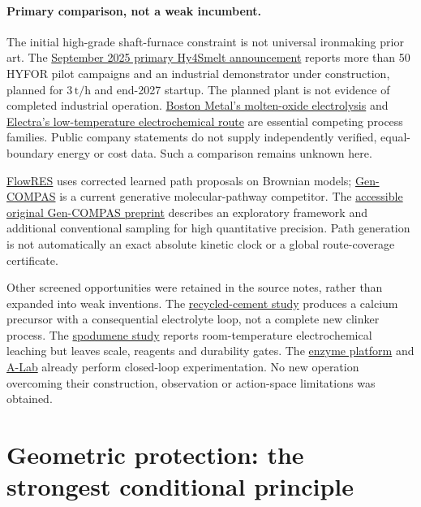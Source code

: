 \documentclass[11pt]{article}
\begin{document}
\paragraph{Primary comparison, not a weak incumbent.}
The initial high-grade shaft-furnace constraint is not universal ironmaking
prior art. The \href{https://www.primetals.com/en/news/construction-begins-on-hydrogen-based-ironmaking-plant-in-linz-austria/}{September 2025 primary Hy4Smelt announcement}
reports more than 50 HYFOR pilot campaigns and an industrial demonstrator under
construction, planned for $3\,\mathrm{t/h}$ and end-2027 startup.
The planned plant is not evidence of completed industrial operation.
\href{https://www.bostonmetal.com/moe-steel/}{Boston Metal's molten-oxide electrolysis}
and \href{https://ecs.confex.com/ecs/prime2024/meetingapp.cgi/Paper/197400}{Electra's low-temperature electrochemical route}
are essential competing process families. Public company statements do not
supply independently verified, equal-boundary energy or cost data. Such a
comparison remains unknown here.

\href{https://www.nature.com/articles/s42256-024-00918-3}{FlowRES}
uses corrected learned path proposals on Brownian models;
\href{https://www.nature.com/articles/s41586-026-11025-1}{Gen-COMPAS}
is a current generative molecular-pathway competitor. The
\href{https://arxiv.org/html/2510.24979v1}{accessible original Gen-COMPAS preprint}
describes an exploratory framework and additional conventional sampling for
high quantitative precision. Path generation is not automatically an exact
absolute kinetic clock or a global route-coverage certificate.

Other screened opportunities were retained in the source notes, rather than
expanded into weak inventions. The
\href{https://doi.org/10.1038/s41467-025-64339-5}{recycled-cement study}
produces a calcium precursor with a consequential electrolyte loop, not a
complete new clinker process. The
\href{https://doi.org/10.1038/s41467-024-48867-0}{spodumene study}
reports room-temperature electrochemical leaching but leaves scale, reagents
and durability gates. The
\href{https://doi.org/10.1038/s41467-025-61209-y}{enzyme platform}
and \href{https://doi.org/10.1038/s41586-023-06734-w}{A-Lab}
already perform closed-loop experimentation. No new operation overcoming their
construction, observation or action-space limitations was obtained.

\section{Geometric protection: the strongest conditional principle}
\label{sec:control}
\end{document}

